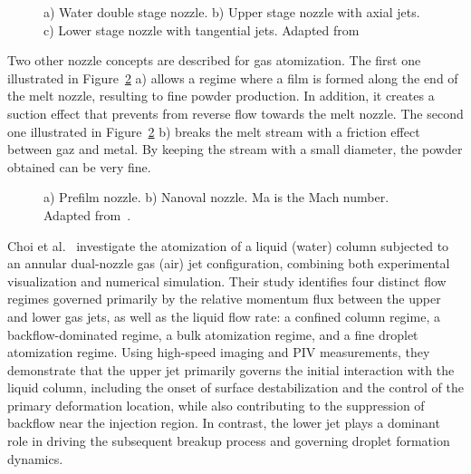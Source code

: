 \documentclass[../main]{subfiles}
\begin{document}
\vspace{0mm}
\begin{figure}[H]
    \centering
        
        \caption[Water double stage nozzle]{a) Water double stage nozzle. b) Upper stage nozzle with axial jets. c) Lower stage nozzle with tangential jets. Adapted from~\cite{Neikov2009HandbookNonFerrous}}
        \label{f:water_double_stage_nozzle}
\end{figure}
\FloatBarrier
\vspace{0mm}

Two other nozzle concepts are described for gas atomization. The first one illustrated in Figure~\ref{prefilm_and_nanoval} a) allows a regime where a film is formed along the end of the melt nozzle, resulting to fine powder production. In addition, it creates a suction effect that prevents from reverse flow towards the melt nozzle. The second one illustrated in Figure~\ref{prefilm_and_nanoval} b) breaks the melt stream with a friction effect between gaz and metal. By keeping the stream with a small diameter, the powder obtained can be very fine.

\vspace{0mm}
\begin{figure}[H]
    \centering
        
        \caption[Prefilm and Nanoval nozzle]{a) Prefilm nozzle. b) Nanoval nozzle. Ma is the Mach number. Adapted from~\cite{Neikov2009HandbookNonFerrous,Cacace2024InvestigationEffect}.}
        \label{prefilm_and_nanoval}
\end{figure}
\FloatBarrier
\vspace{0mm}

Choi et al.~\cite{Choi2022AnalysisLiquid} investigate the atomization of a liquid (water) column subjected to an annular dual-nozzle gas (air) jet configuration, combining both experimental visualization and numerical simulation. Their study identifies four distinct flow regimes governed primarily by the relative momentum flux between the upper and lower gas jets, as well as the liquid flow rate: a confined column regime, a backflow-dominated regime, a bulk atomization regime, and a fine droplet atomization regime. Using high-speed imaging and PIV measurements, they demonstrate that the upper jet primarily governs the initial interaction with the liquid column, including the onset of surface destabilization and the control of the primary deformation location, while also contributing to the suppression of backflow near the injection region. In contrast, the lower jet plays a dominant role in driving the subsequent breakup process and governing droplet formation dynamics.
\end{document}
